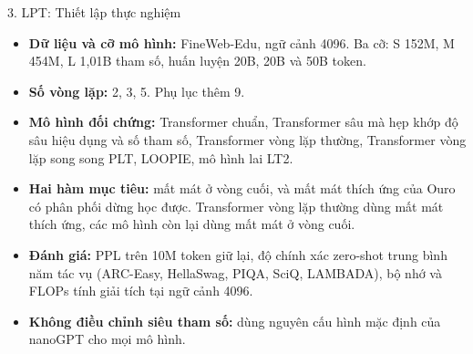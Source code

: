 \begin{frame}{3. LPT: Thiết lập thực nghiệm}
    \begin{itemize}
        \item \textbf{Dữ liệu và cỡ mô hình:} FineWeb-Edu, ngữ cảnh 4096. Ba cỡ: S 152M, M 454M, L 1,01B tham số, huấn luyện 20B, 20B và 50B token.
        \item \textbf{Số vòng lặp:} 2, 3, 5. Phụ lục thêm 9.
        \item \textbf{Mô hình đối chứng:} Transformer chuẩn, Transformer sâu mà hẹp khớp độ sâu hiệu dụng và số tham số, Transformer vòng lặp thường, Transformer vòng lặp song song PLT, LOOPIE, mô hình lai LT2.
        \item \textbf{Hai hàm mục tiêu:} mất mát ở vòng cuối, và mất mát thích ứng của Ouro có phân phối dừng học được. Transformer vòng lặp thường dùng mất mát thích ứng, các mô hình còn lại dùng mất mát ở vòng cuối.
        \item \textbf{Đánh giá:} PPL trên 10M token giữ lại, độ chính xác zero-shot trung bình năm tác vụ (ARC-Easy, HellaSwag, PIQA, SciQ, LAMBADA), bộ nhớ và FLOPs tính giải tích tại ngữ cảnh 4096.
        \item \textbf{Không điều chỉnh siêu tham số:} dùng nguyên cấu hình mặc định của nanoGPT cho mọi mô hình.
    \end{itemize}
\end{frame}

